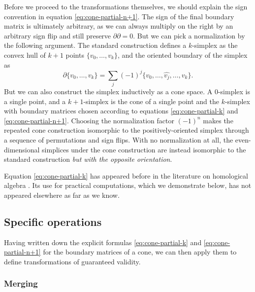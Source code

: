 \documentclass[twocolumn]{article}
\begin{document}
Before we proceed to the transformations themselves, we should explain the sign convention in equation \eqref{eq:cone-partial-n+1}.
The sign of the final boundary matrix is ultimately arbitrary, as we can always multiply on the right by an arbitrary sign flip and still preserve $\partial\partial = 0$.
But we can pick a normalization by the following argument.
The standard construction defines a $k$-simplex as the convex hull of $k + 1$ points $\{v_0, \ldots, v_k\}$, and the oriented boundary of the simplex as
\begin{equation}
    \partial\{v_0,\ldots,v_k\} = \sum_j(-1)^j\{v_0, \ldots, \hat{v_j}, \ldots, v_k\}.
\end{equation}
But we can also construct the simplex inductively as a cone space.
A 0-simplex is a single point, and a $k + 1$-simplex is the cone of a single point and the $k$-simplex with boundary matrices chosen according to equations \eqref{eq:cone-partial-k} and \eqref{eq:cone-partial-n+1}.
Choosing the normalization factor $(-1)^n$ makes the repeated cone construction isomorphic to the positively-oriented simplex through a sequence of permutations and sign flips.
With no normalization at all, the even-dimensional simplices under the cone construction are instead isomorphic to the standard construction \emph{but with the opposite orientation}.

Equation \eqref{eq:cone-partial-k} has appeared before in the literature on homological algebra \cite{gelfand1994homological}.
Its use for practical computations, which we demonstrate below, has not appeared elsewhere as far as we know.


\subsection{Specific operations}

Having written down the explicit formulas \eqref{eq:cone-partial-k} and \eqref{eq:cone-partial-n+1} for the boundary matrices of a cone, we can then apply them to define transformations of guaranteed validity.

\subsubsection{Merging}
\end{document}
